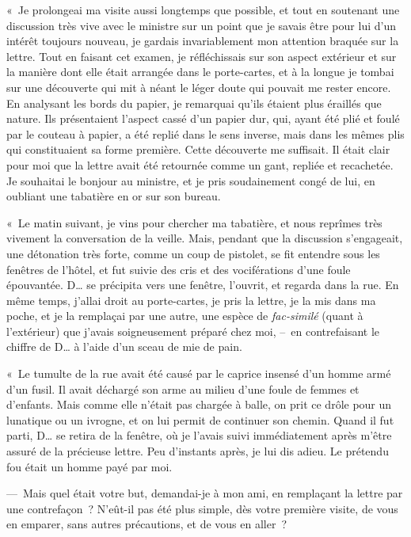 \documentclass[french,twoside]{book} %
\begin{document}
« Je prolongeai ma visite aussi longtemps que possible, et tout en soutenant une discussion très vive avec le ministre sur un point que je savais être pour lui d’un intérêt toujours nouveau, je gardais invariablement mon attention braquée sur la lettre. Tout en faisant cet examen, je réfléchissais sur son aspect extérieur et sur la manière dont elle était arrangée dans le porte-cartes, et à la longue je tombai sur une découverte qui mit à néant le léger doute qui pouvait me rester encore. En analysant les bords du papier, je remarquai qu’ils étaient plus éraillés que nature. Ils présentaient l’aspect cassé d’un papier dur, qui, ayant été plié et foulé par le couteau à papier, a été replié dans le sens inverse, mais dans les mêmes plis qui constituaient sa forme première. Cette découverte me suffisait. Il était clair pour moi que la lettre avait été retournée comme un gant, repliée et recachetée. Je souhaitai le bonjour au ministre, et je pris soudainement congé de lui, en oubliant une tabatière en or sur son bureau.\par
« Le matin suivant, je vins pour chercher ma tabatière, et nous reprîmes très vivement la conversation de la veille. Mais, pendant que la discussion s’engageait, une détonation très forte, comme un coup de pistolet, se fit entendre sous les fenêtres de l’hôtel, et fut suivie des cris et des vociférations d’une foule épouvantée. D… se précipita vers une fenêtre, l’ouvrit, et regarda dans la rue. En même temps, j’allai droit au porte-cartes, je pris la lettre, je la mis dans ma poche, et je la remplaçai par une autre, une espèce de \emph{fac-similé} (quant à l’extérieur) que j’avais soigneusement préparé chez moi, – en contrefaisant le chiffre de D… à l’aide d’un sceau de mie de pain.\par
« Le tumulte de la rue avait été causé par le caprice insensé d’un homme armé d’un fusil. Il avait déchargé son arme au milieu d’une foule de femmes et d’enfants. Mais comme elle n’était pas chargée à balle, on prit ce drôle pour un lunatique ou un ivrogne, et on lui permit de continuer son chemin. Quand il fut parti, D… se retira de la fenêtre, où je l’avais suivi immédiatement après m’être assuré de la précieuse lettre. Peu d’instants après, je lui dis adieu. Le prétendu fou était un homme payé par moi.\par
— Mais quel était votre but, demandai-je à mon ami, en remplaçant la lettre par une contrefaçon ? N’eût-il pas été plus simple, dès votre première visite, de vous en emparer, sans autres précautions, et de vous en aller ?\par
\end{document}
